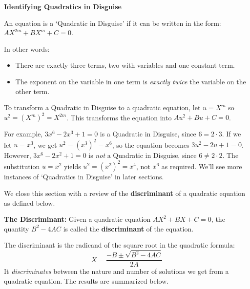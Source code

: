 \documentclass[10pt]{article}
\begin{document}
\label{QuadinDisguise}
\colorbox{ResultColor}{\bbm

\centerline{\textbf{Identifying Quadratics in Disguise}}

An equation is a `Quadratic in Disguise' if it can be written in the form:  $AX^{2m} + BX^{m} + C = 0$.  

In other words:

\begin{itemize}

\item There are exactly three terms, two with variables and one constant term.

\item  The exponent on the variable in one term is \textit{exactly twice} the variable on the other term.

\end{itemize}

To transform a Quadratic in Disguise to a quadratic equation, let $u = X^m$ so $u^2 = (X^m)^2 = X^{2m}$. This transforms the equation into $Au^2 + Bu + C = 0$.

\ebm}

\medskip

For example, $3x^6 - 2x^3 + 1 = 0$ is a Quadratic in Disguise, since $6 = 2 \cdot 3$.  If we let $u = x^3$, we get $u^2 = (x^3)^2 = x^6$, so the equation becomes $3u^2 - 2u + 1 = 0$.  However, $3x^6 - 2x^2 + 1 = 0$ is \textit{not} a Quadratic in Disguise, since $6 \neq 2\cdot 2$. The substitution $u = x^2$ yields $u^2 = (x^2)^2 = x^4$, not $x^6$ as required.  We'll see more instances of `Quadratics in Disguise' in later sections.

\medskip

We close this section with a review of the \textbf{discriminant} of a quadratic equation as defined below.

\medskip

\colorbox{ResultColor}{\bbm
\begin{defn} \textbf{The Discriminant:} Given a quadratic equation $AX^2 + BX + C = 0$, the quantity $B^2 - 4AC$ is called the \textbf{discriminant} of the equation.

\end{defn}
\ebm}

\medskip

The discriminant is the radicand of the square root in the quadratic formula:  \[X  = \dfrac{-B \pm \sqrt{B^2 - 4AC}}{2A} \] It \textit{discriminates} between the nature and number of solutions we get from a quadratic equation.   The results are summarized below. 
\end{document}
